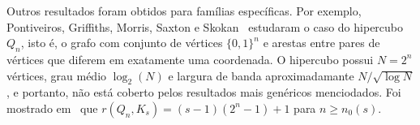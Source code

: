 Outros resultados foram obtidos para famílias específicas. Por exemplo, Pontiveiros, Griffiths, Morris, Saxton e Skokan~\cite{pontiveros2014ramsey} estudaram o caso do hipercubo $Q_n$, isto é, o grafo com conjunto de vértices $\{ 0, 1 \}^n$ e arestas entre pares de vértices que diferem em exatamente uma coordenada. O hipercubo possui $N=2^n$ vértices, grau médio $\log_2(N)$ e largura de banda aproximadamante $N/\sqrt{\log N}$, e portanto, não está coberto pelos resultados mais genéricos menciodados. Foi mostrado em~\cite{pontiveros2014ramsey} que $r(Q_n, K_s) = (s-1)(2^n -1) + 1$ para $n \geq n_0(s)$.





